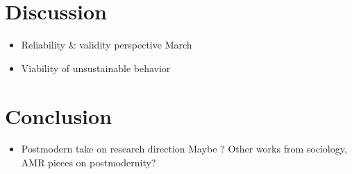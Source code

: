 \documentclass{article}
\begin{document}
	\section*{Discussion}

	\begin{itemize}
		\item Reliability \& validity perspective
			\subitem \citet{Rerup2021}
			March
		\item Viability of unsustainable behavior
			\subitem \citet{Habermas1984}
	\end{itemize}

	\section*{Conclusion}

	\begin{itemize}
		\item Postmodern take on research direction
			\subitem \citet{Giddens1979}
			\subitem Maybe \citet{Fraser1988}?
			\subitem Other works from sociology, AMR pieces on postmodernity?
	\end{itemize}

	\clearpage
	
	
\end{document}
